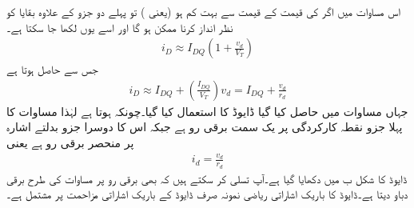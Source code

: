 اس مساوات میں اگر   کی قیمت  کے قیمت سے بہت کم ہو (یعنی ) تو پہلے دو جزو کے علاوہ بقایا کو نظر انداز کرنا ممکن ہو گا اور اسے یوں لکھا جا سکتا ہے۔
\begin{align}
i_D \approx I_{DQ} \left (1+\frac{v_d}{V_T} \right )
\end{align}
جس سے حاصل ہوتا ہے
\begin{align} \label{مساوات_ڈایوڈ_یکسمتی_اور_بدلتا_رو}
i_D \approx I_{DQ} +\left( \frac{I_{DQ}}{V_T} \right ) v_d = I_{DQ}+\frac{v_d}{r_d}
\end{align}
جہاں مساوات  میں حاصل کیا گیا ڈایوڈ کا   استعمال کیا گیا۔چونکہ  ہوتا ہے لہٰذا مساوات   کا پہلا جزو نقطہ کارکردگی پر یک سمت برقی رو  ہے جبکہ اس کا دوسرا جزو بدلتے اشارہ   پر منحصر برقی رو  ہے یعنی
\begin{align} \label{مساوات_ڈایوڈ_باریک_ماڈل_کا_حصول}
i_d = \frac{v_d}{r_d}
\end{align}
ڈایوڈ کا   شکل  ب میں دکھایا گیا ہے۔آپ تسلی کر سکتے ہیں کہ  بھی برقی رو  پر  مساوات  کی طرح برقی دباو   دیتا ہے۔ڈایوڈ کا باریک اشاراتی ریاضی نمونہ صرف ڈایوڈ کے باریک اشاراتی مزاحمت  پر مشتمل ہے۔


